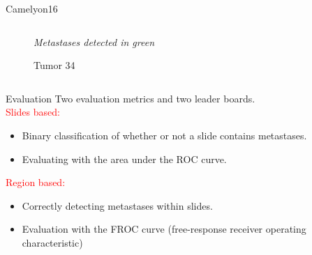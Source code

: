 \documentclass{beamer}
\begin{document}
\begin{frame}{Camelyon16}
\begin{columns}[T]
\begin{column}{.50\textwidth}
\begin{figure}[!ht]
\caption{Tumor 34}
{\footnotesize \textit{Metastases detected in green}}
\label{tumor_34}
\end{figure}
\end{column}%
\end{columns}

\end{frame}

\begin{frame}{Evaluation}
Two evaluation metrics and two leader boards. \\
\textcolor{red}{Slides based:}
\begin{itemize}
\item Binary classification of whether or not a slide contains metastases. \item Evaluating with the area under the ROC curve. 
\end{itemize}
\textcolor{red}{Region based:}
\begin{itemize}
\item Correctly detecting metastases within slides.
\item Evaluation with the FROC curve (free-response receiver operating characteristic)
\end{itemize}
\end{frame}
\end{document}
